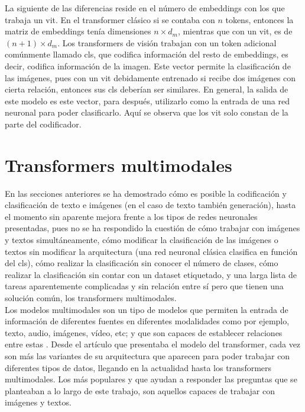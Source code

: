 			La siguiente de las diferencias reside en el número de embeddings con los que trabaja un \gls{vit}. En el transformer clásico si se contaba con $n$ tokens, entonces la matriz de embeddings tenía dimensiones $n \times d_m$, mientras que con un \gls{vit}, es de $(n + 1) \times d_m$. Los transformers de visión trabajan con un token adicional comúnmente llamado \gls{cls}, que codifica información del resto de embeddings, es decir, codifica información de la imagen. Este vector permite la clasificación de las imágenes, pues con un \gls{vit} debidamente entrenado si recibe dos imágenes con cierta relación, entonces sus \gls{cls} deberían ser similares. En general, la salida de este modelo es este vector, para después, utilizarlo como la entrada de una red neuronal para poder clasificarlo. Aquí se observa que los \gls{vit} solo constan de la parte del codificador. 
			
		\section{Transformers multimodales}
		
			En las secciones anteriores se ha demostrado cómo es posible la codificación y clasificación de texto e imágenes (en el caso de texto también generación), hasta el momento sin aparente mejora frente a los tipos de redes neuronales presentadas, pues no se ha respondido la cuestión de cómo trabajar con imágenes y textos simultáneamente, cómo modificar la clasificación de las imágenes o textos sin modificar la arquitectura (una red neuronal clásica clasifica en función del \gls{cls}), cómo realizar la clasificación sin conocer el número de clases, cómo realizar la clasificación sin contar con un dataset etiquetado, y una larga lista de tareas aparentemente complicadas y sin relación entre sí pero que tienen una solución común, los transformers multimodales. \\
			
			Los modelos multimodales son un tipo de modelos que permiten la entrada de información de diferentes fuentes en diferentes modalidades como por ejemplo, texto, audio, imágenes, vídeo, etc; y que son capaces de establecer relaciones entre estas \cite{multimodal_dl}. Desde el artículo que presentaba el modelo del transformer, cada vez son más las variantes de su arquitectura que aparecen para poder trabajar con diferentes tipos de datos, llegando en la actualidad hasta los transformers multimodales. Los más populares y que ayudan a responder las preguntas que se planteaban a lo largo de este trabajo, son aquellos capaces de trabajar con imágenes y textos. \\
			
